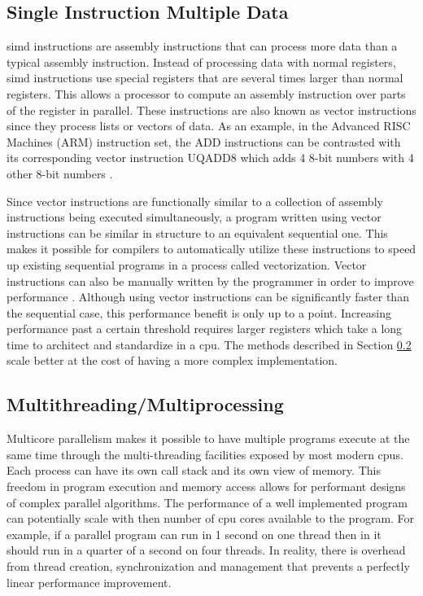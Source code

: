 \subsection{Single Instruction Multiple Data} \label{simd}

\gls{simd} instructions are assembly instructions that can process more data
than a typical assembly instruction. Instead of processing data with normal
registers, \gls{simd} instructions use special registers that are several times
larger than normal registers. This allows a processor to compute an assembly
instruction over parts of the register in parallel. These instructions are
also known as vector instructions since they process lists or vectors of data.
As an example, in the Advanced RISC Machines (ARM) instruction set, the ADD
instructions can be contrasted with its corresponding vector instruction UQADD8
which adds 4 8-bit numbers with 4 other 8-bit numbers \citep{noauthor_arm_nodate}.

Since vector instructions are functionally similar to a collection of assembly
instructions being executed simultaneously, a program written using vector
instructions can be similar in structure to an equivalent sequential one. This
makes it possible for compilers to automatically utilize these instructions
to speed up existing sequential programs in a process called vectorization.
Vector instructions can also be manually written by the programmer in order to
improve performance \cite{langdale_parsing_2019, mytkowicz_data-parallel_2014}.
Although using vector instructions can be significantly faster than the
sequential case, this performance benefit is only up to a point. Increasing
performance past a certain threshold requires larger registers which take a
long time to architect and standardize in a \gls{cpu}. The methods described in
Section \ref{multithreading} scale better at the cost of having a more complex
implementation.

\subsection{Multithreading/Multiprocessing} \label{multithreading}

Multicore parallelism makes it possible to have multiple programs execute
at the same time through the multi-threading facilities exposed by most
modern \glspl{cpu}. Each process can have its own call stack and its own view
of memory. This freedom in program execution and memory access allows for
performant designs of complex parallel algorithms. The performance of a well
implemented program can potentially scale with then number of \gls{cpu} cores
available to the program. For example, if a parallel program can run in 1 second
on one thread then in it should run in a quarter of a second on four threads. In
reality, there is overhead from thread creation, synchronization and management
that prevents a perfectly linear performance improvement.

